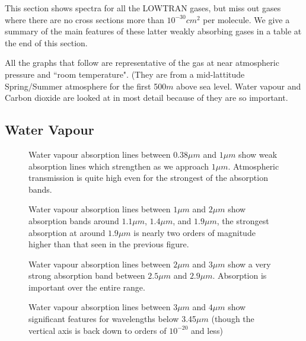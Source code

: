 \documentclass[12pt]{article}
\begin{document}
This section  shows spectra for all the LOWTRAN gases, but miss
 out gases where there are no cross sections more than $10^{-30}cm^2$ per molecule. We 
 give a summary of the main features of these latter weakly absorbing gases in a table at the end of this section. 

 All the graphs that follow
are representative of the gas at near atmospheric pressure and ``room temperature". (They are from a
 mid-lattitude Spring/Summer atmosphere for the first 500$m$ above sea level. Water vapour and Carbon dioxide
are looked at in most detail because of they are so important.


\newpage

\subsection{Water Vapour}

\vspace*{13.5cm}
\begin{figure}[htb]
\caption{
Water vapour absorption lines between $0.38\mu m$ and $1\mu m$ show weak absorption lines
which strengthen as we approach $1\mu m$. Atmospheric transmission is quite high even for the strongest
of the absorption bands.}  
\end{figure}
\newpage

\vspace*{11.5cm}
\begin{figure}[htb]
\caption{Water vapour absorption lines between $1\mu m$ and $2\mu m$ show absorption bands
around $1.1\mu m$, $1.4\mu m$, and $1.9 \mu m$, the strongest absorption at around $1.9 \mu m$ is
nearly two orders of magnitude higher than that seen in the previous figure.}  
\end{figure}
\newpage

\vspace*{11.5cm}
\begin{figure}[htb]
\caption{Water vapour absorption lines between $2\mu m$ and $3\mu m$ show a very strong absorption band
between $2.5\mu m$  and $2.9 \mu m$. Absorption is important over the entire range.}
\end{figure}
\newpage

\vspace*{11.5cm}
\begin{figure}[htb]
\caption{Water vapour absorption lines between $3\mu m$ and $4\mu m$
   show significant features for wavelengths below 3.45$\mu m$ (though the vertical axis
 is back down to orders of $10^{-20}$ and less) }    
\end{figure}
\newpage
\end{document}
